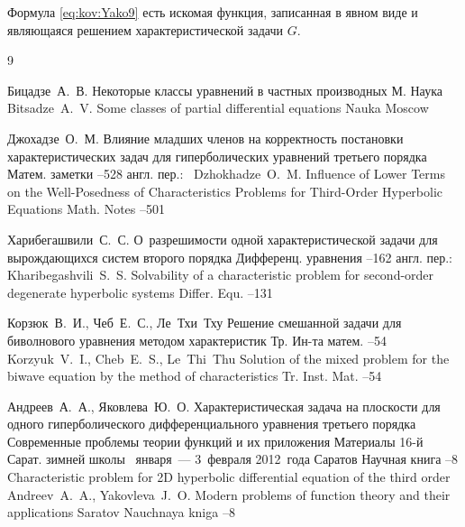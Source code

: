 Формула \eqref{eq:kov:Yako9} есть искомая функция, записанная в
явном виде и являющаяся решением характеристической задачи $G$.

\smallskip

\begin{thebibliography}{9}

  \by Бицадзе~А.~В.\book
Некоторые классы уравнений в частных производных \publaddr М.
\publ Наука  
\misctransl
\by Bitsadze~A.~V. 
\book Some classes of partial differential equations
\publ Nauka
\publaddr Moscow

\by Джохадзе~О.~М.
\paper Влияние младших членов на корректность постановки характеристических задач для гиперболических уравнений третьего порядка
\jour Матем. заметки
--528
\transl англ. пер.:~
\by Dzhokhadze~O.~M.
\paper Influence of Lower Terms on the Well-Posedness of Characteristics Problems for Third-Order Hyperbolic Equations
\jour Math. Notes
--501

\by Харибегашвили~С.~С.
\paper О~разрешимости одной характеристической задачи для вырождающихся систем второго порядка 
\jour Дифференц. уравнения 
--162
\transl англ. пер.:~
\by Kharibegashvili~S.~S. 
\paper Solvability of a characteristic problem for second-order degenerate hyperbolic systems
\jour Differ. Equ.
–131 

\by Корзюк~В.~И., Чеб~Е.~С., Ле~Тхи~Тху 
\paper Решение смешанной задачи для биволнового уравнения методом характеристик
\jour Тр. Ин-та матем.
--54
\misctransl 
\by Korzyuk~V.~I., Cheb~E.~S., Le~Thi~Thu
\paper Solution of the mixed problem for the biwave equation by the method of characteristics
\jour Tr. Inst. Mat.
--54

\by Андреев~А.~А., Яковлева~Ю.~О. 
\paper Характеристическая задача на плоскости для одного гиперболического дифференциального уравнения третьего порядка
\inbook Современные проблемы теории функций и их приложения
\bookinfo Материалы 16-й Сарат. зимней школы 
~января~— 3~февраля 2012~года
\publaddr Саратов
\publ Научная книга
--8 
\misctransl
\paper Characteristic problem  for 2D hyperbolic differential equation of the third order
\by Andreev~A.~A., Yakovleva~J.~O.
\inbook Modern problems of function theory and their applications
\publaddr Saratov
\publ Nauchnaya kniga
--8

\end{thebibliography}


